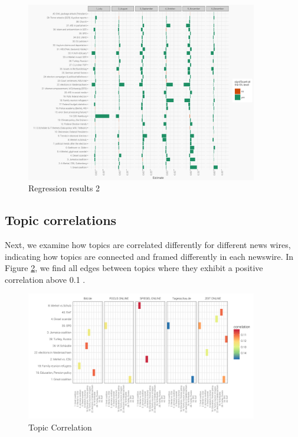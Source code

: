 \documentclass[12pt,a4paper,notitlepage]{article}
\begin{document}
\begin{figure}[H]
	\caption{Regression results 2}
		\begin{center}
			\includegraphics[width=0.9\textwidth,keepaspectratio]{../figs/estimates_month.png}
		\end{center}
	\label{fig_estimateEffects2}
\end{figure}


\subsection{Topic correlations}

Next, we examine how topics are correlated differently for different news wires, indicating how topics are connected and framed differently in each newswire. In Figure \ref{fig_topic_correlations}, we find all edges between topics where they exhibit a positive correlation above 0.1 \citep{roberts_model_2016}.


\begin{figure}[H]
	\caption{Topic Correlation}
		\begin{center}
			\includegraphics[width=0.9\textwidth,keepaspectratio]{../figs/topic_correlation.png}
		\end{center}
	\label{fig_topic_correlations}
\end{figure}
\end{document}
